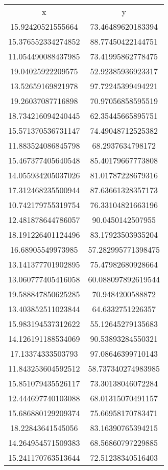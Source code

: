 \begin{table}
\begin{tabular}{cc}
x & y \\
15.92420521555664 & 73.46489620183394 \\
15.376552334274852 & 88.77450422144751 \\
11.054490088437985 & 73.41995862778475 \\
19.04025922209575 & 52.92385936923317 \\
13.52659169821978 & 97.72245399494221 \\
19.26037087716898 & 70.97056858595519 \\
18.734216094240445 & 62.35445665895751 \\
15.571370536731147 & 74.49048712525382 \\
11.883524086845798 & 68.2937634798172 \\
15.467377405640548 & 85.40179667773808 \\
14.055934205037026 & 81.01787228679316 \\
17.312468235500944 & 87.63661328357173 \\
10.742179755319754 & 76.33104821663196 \\
12.481878644786057 & 90.0450142507955 \\
18.191226401124496 & 83.17923503935204 \\
16.68905549973985 & 57.282995771398475 \\
13.141377701902895 & 75.47982680928664 \\
13.060777405416058 & 60.088097892619544 \\
19.588847850625285 & 70.9484200588872 \\
13.403852511023844 & 64.6332751226357 \\
15.983194537312622 & 55.12645279135683 \\
14.126191188534069 & 90.53893284550321 \\
17.13374333503793 & 97.08646399710143 \\
11.843253604592512 & 58.737340274983985 \\
15.851079435526117 & 73.30138046072284 \\
12.444697740103088 & 68.01315070491157 \\
15.686880129209374 & 75.66958170783471 \\
18.22843641545056 & 83.16390765394215 \\
14.264954571509383 & 68.56860797229885 \\
15.241170763513644 & 72.51238340516403 \\

\end{tabular}
\end{table}

